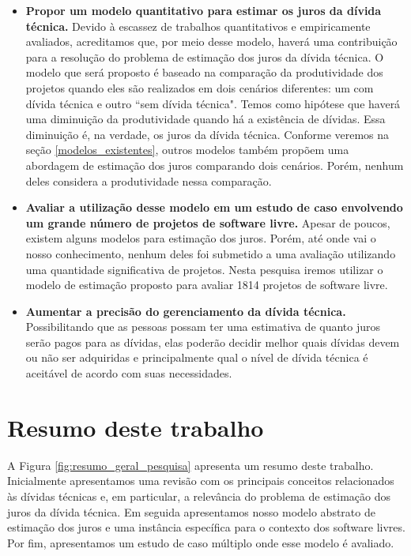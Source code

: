 \begin{itemize}
\item  \textbf{Propor um modelo quantitativo para estimar os juros da dívida técnica.} Devido à escassez de trabalhos quantitativos e empiricamente avaliados, acreditamos que, por meio desse modelo, haverá uma contribuição para a resolução do problema de estimação dos juros da dívida técnica. O modelo que será proposto é baseado na comparação da produtividade dos projetos quando eles são realizados em dois cenários diferentes: um com dívida técnica e outro ``sem dívida técnica". Temos como hipótese que haverá uma diminuição da produtividade quando há a existência de dívidas. Essa diminuição é, na verdade, os juros da dívida técnica. Conforme veremos na seção \ref{modelos_existentes}, outros modelos também propõem uma abordagem de estimação dos juros comparando dois cenários. Porém, nenhum deles considera a produtividade nessa comparação. 
\item  \textbf{Avaliar a utilização desse modelo em um estudo de caso envolvendo um grande número de projetos de software livre.} Apesar de poucos, existem alguns modelos para estimação dos juros. Porém, até onde vai o nosso conhecimento, nenhum deles foi submetido a uma avaliação utilizando uma quantidade significativa de projetos. Nesta pesquisa iremos utilizar o modelo de estimação proposto para avaliar 1814 projetos de software livre.
\item  \textbf{Aumentar a precisão do gerenciamento da dívida técnica.}  Possibilitando que as pessoas possam ter uma estimativa de quanto juros serão pagos para as dívidas, elas poderão decidir melhor quais dívidas devem ou não ser adquiridas e principalmente qual o nível de dívida técnica é aceitável de acordo com suas necessidades. 
\end{itemize}


\section{Resumo deste trabalho}
A Figura \ref{fig:resumo_geral_pesquisa} apresenta um resumo deste trabalho. Inicialmente apresentamos uma revisão com os principais conceitos relacionados às dívidas técnicas e, em particular, a relevância do problema de estimação dos juros da dívida técnica. Em seguida apresentamos nosso modelo abstrato de estimação dos juros e uma instância específica para o contexto dos software livres. Por fim, apresentamos um estudo de caso múltiplo onde esse modelo é avaliado. 



